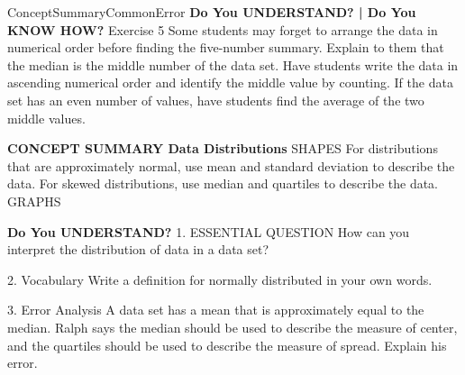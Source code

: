 \documentclass{article}
\newenvironment{concept-summary}{}{}    %
\newenvironment{te-addendum}[2]{}{}     %
\newcommand{\answer}[1]{}               %
\newcommand{\placeholder}[2]{}          %
\begin{document}
\begin{te-addendum}{ConceptSummary}{CommonError}
\textbf{Do You UNDERSTAND? | Do You KNOW HOW?}
Exercise 5 Some students may forget to arrange the data in numerical order before finding the five-number summary. Explain to them that the median is the middle number of the data set. Have students write the data in ascending numerical order and identify the middle value by counting. If the data set has an even number of values, have students find the average of the two middle values.
\end{te-addendum}
\begin{concept-summary}
\textbf{CONCEPT SUMMARY Data Distributions}
SHAPES
For distributions that are approximately normal, use mean and standard deviation to describe the data.
For skewed distributions, use median and quartiles to describe the data.
GRAPHS
\placeholder{graph}{Skewed left: red curve with long left tail; vertical Frequency axis, unlabeled horizontal axis, positive arrowheads. Blue dashed vertical lines from left to right Mean, Median, Mode at peak. Negative direction with leftward arrow below. No numerical ticks.}
\placeholder{graph}{Normal (no skew): red symmetric bell curve with a blue dashed vertical centerline labeled Mean Median Mode; unscaled axes with positive arrowheads. Caption: Normal distributions are symmetric with a central peak.}
\placeholder{graph}{Skewed right: red curve with long right tail; blue dashed lines from left to right Mode at peak, Median, Mean. Unscaled axes with positive arrowheads. Positive direction with rightward arrow below.}
\textbf{Do You UNDERSTAND?}
1. ESSENTIAL QUESTION How can you interpret the distribution of data in a data set?
\answer{Look at the shape of a data distribution to determine if it is skewed left, skewed right, or symmetrically distributed. Use mean and standard deviation to determine center and spread for symmetric distributions, and use median and interquartile range to determine center and spread for skewed distributions.}
2. Vocabulary Write a definition for normally distributed in your own words.
\answer{The graph of a model that is normally distributed has a bell-shaped curve that is symmetric about the mean.}
3. Error Analysis A data set has a mean that is approximately equal to the median. Ralph says the median should be used to describe the measure of center, and the quartiles should be used to describe the measure of spread. Explain his error.
\answer{When the mean is approximately equal to the median, the data set is more likely to be symmetric. This means the mean should be used to describe the center and the standard deviation should be used to describe the spread.}

\end{concept-summary}
\end{document}
